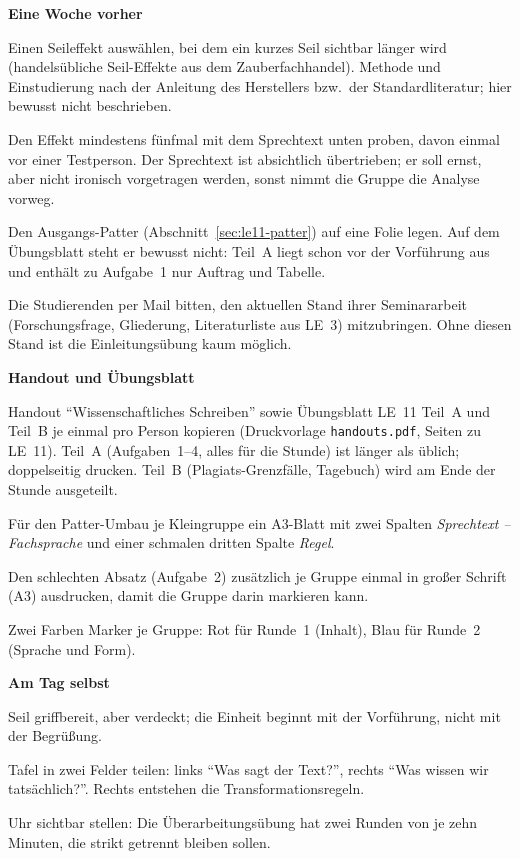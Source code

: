 \begin{vorbereitung}
\textbf{Eine Woche vorher}
\begin{checkliste}
  \item Einen Seileffekt auswählen, bei dem ein kurzes Seil sichtbar länger
    wird (handelsübliche Seil-Effekte aus dem Zauberfachhandel). Methode
    und Einstudierung nach der Anleitung des Herstellers bzw.\ der
    Standardliteratur; hier bewusst nicht beschrieben.
  \item Den Effekt mindestens fünfmal mit dem Sprechtext unten proben,
    davon einmal vor einer Testperson. Der Sprechtext ist absichtlich
    übertrieben; er soll ernst, aber nicht ironisch vorgetragen werden,
    sonst nimmt die Gruppe die Analyse vorweg.
  \item Den Ausgangs-Patter (Abschnitt~\ref{sec:le11-patter}) auf eine
    Folie legen. Auf dem Übungsblatt steht er bewusst nicht: Teil~A liegt
    schon vor der Vorführung aus und enthält zu Aufgabe~1 nur Auftrag und
    Tabelle.
  \item Die Studierenden per Mail bitten, den aktuellen Stand ihrer
    Seminararbeit (Forschungsfrage, Gliederung, Literaturliste aus LE~3)
    mitzubringen. Ohne diesen Stand ist die Einleitungsübung kaum möglich.
\end{checkliste}

\textbf{Handout und Übungsblatt}
\begin{checkliste}
  \item Handout \enquote{Wissenschaftliches Schreiben} sowie
    Übungsblatt LE~11 Teil~A und Teil~B je einmal pro Person kopieren
    (Druckvorlage \texttt{handouts.pdf}, Seiten zu LE~11). Teil~A
    (Aufgaben~1--4, alles für die Stunde) ist länger als üblich;
    doppelseitig drucken. Teil~B (Plagiats-Grenzfälle, Tagebuch) wird am
    Ende der Stunde ausgeteilt.
  \item Für den Patter-Umbau je Kleingruppe ein A3-Blatt mit zwei
    Spalten \emph{Sprechtext -- Fachsprache} und einer schmalen dritten
    Spalte \emph{Regel}.
  \item Den schlechten Absatz (Aufgabe~2) zusätzlich je Gruppe einmal in
    großer Schrift (A3) ausdrucken, damit die Gruppe darin markieren kann.
  \item Zwei Farben Marker je Gruppe: Rot für Runde~1 (Inhalt), Blau für
    Runde~2 (Sprache und Form).
\end{checkliste}

\textbf{Am Tag selbst}
\begin{checkliste}
  \item Seil griffbereit, aber verdeckt; die Einheit beginnt mit der
    Vorführung, nicht mit der Begrüßung.
  \item Tafel in zwei Felder teilen: links \enquote{Was sagt der Text?},
    rechts \enquote{Was wissen wir tatsächlich?}. Rechts entstehen die
    Transformationsregeln.
  \item Uhr sichtbar stellen: Die Überarbeitungsübung hat zwei Runden von
    je zehn Minuten, die strikt getrennt bleiben sollen.
\end{checkliste}


\end{vorbereitung}
